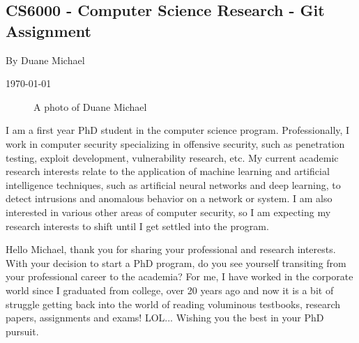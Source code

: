 \documentclass[11pt]{article}
\begin{document}
 
\begin{center}
    
    \section*{CS6000 - Computer Science Research - Git Assignment}
    By Duane Michael
    
    \today
\end{center}   
 

\begin{figure}[h]
    \centering
    \caption{A photo of Duane Michael}
    \label{fig:headshot}
\end{figure}
I am a first year PhD student in the computer science program. Professionally, I work in computer security specializing in offensive security, such as penetration testing, exploit development, vulnerability research, etc. My current academic research interests relate to the application of machine learning and artificial intelligence techniques, such as artificial neural networks and deep learning, to detect intrusions and anomalous behavior on a network or system. I am also interested in various other areas of computer security, so I am expecting my research interests to shift until I get settled into the program.

Hello Michael, thank you for sharing your professional and research interests. With your decision to start a PhD program, do you see yourself transiting from your professional career to the academia? For me, I have worked in the corporate world since I graduated from college, over 20 years ago and now it is a bit of struggle getting back into the world of reading voluminous testbooks, research papers, assignments and exams! LOL... Wishing you the best in your PhD pursuit.
\end{document}
